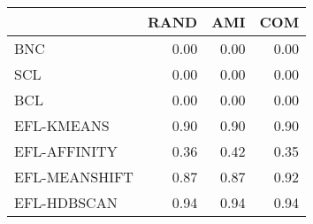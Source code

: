 \begin{tabular}{lrrr}
\toprule
 & RAND & AMI & COM \\
\midrule
BNC & 0.00 & 0.00 & 0.00 \\
SCL & 0.00 & 0.00 & 0.00 \\
BCL & 0.00 & 0.00 & 0.00 \\
EFL-KMEANS & 0.90 & 0.90 & 0.90 \\
EFL-AFFINITY & 0.36 & 0.42 & 0.35 \\
EFL-MEANSHIFT & 0.87 & 0.87 & 0.92 \\
EFL-HDBSCAN & 0.94 & 0.94 & 0.94 \\
\bottomrule
\end{tabular}
